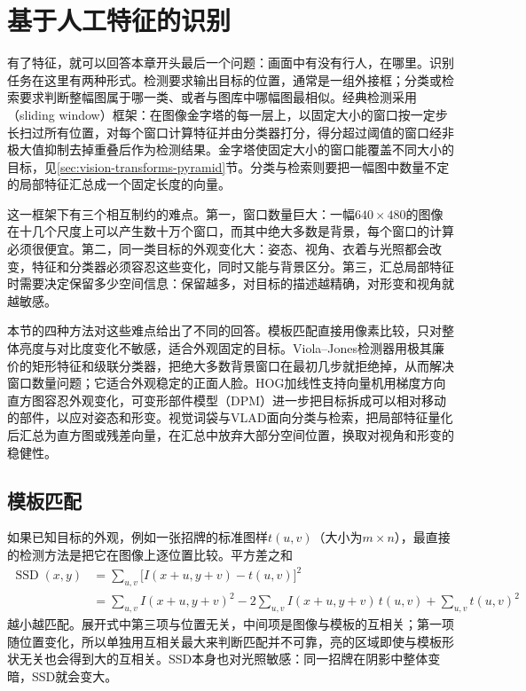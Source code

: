 \section{基于人工特征的识别}
\label{sec:vision-features-recognition}

有了特征，就可以回答本章开头最后一个问题：画面中有没有行人，在哪里。识别任务在这里有两种形式。检测要求输出目标的位置，通常是一组外接框；分类或检索要求判断整幅图属于哪一类、或者与图库中哪幅图最相似。经典检测采用（sliding window）框架：在图像金字塔的每一层上，以固定大小的窗口按一定步长扫过所有位置，对每个窗口计算特征并由分类器打分，得分超过阈值的窗口经非极大值抑制去掉重叠后作为检测结果。金字塔使固定大小的窗口能覆盖不同大小的目标，见\ref{sec:vision-transforms-pyramid}节。分类与检索则要把一幅图中数量不定的局部特征汇总成一个固定长度的向量。

这一框架下有三个相互制约的难点。第一，窗口数量巨大：一幅$640\times480$的图像在十几个尺度上可以产生数十万个窗口，而其中绝大多数是背景，每个窗口的计算必须很便宜。第二，同一类目标的外观变化大：姿态、视角、衣着与光照都会改变，特征和分类器必须容忍这些变化，同时又能与背景区分。第三，汇总局部特征时需要决定保留多少空间信息：保留越多，对目标的描述越精确，对形变和视角就越敏感。

本节的四种方法对这些难点给出了不同的回答。模板匹配直接用像素比较，只对整体亮度与对比度变化不敏感，适合外观固定的目标。Viola–Jones检测器用极其廉价的矩形特征和级联分类器，把绝大多数背景窗口在最初几步就拒绝掉，从而解决窗口数量问题；它适合外观稳定的正面人脸。HOG加线性支持向量机用梯度方向直方图容忍外观变化，可变形部件模型（DPM）进一步把目标拆成可以相对移动的部件，以应对姿态和形变。视觉词袋与VLAD面向分类与检索，把局部特征量化后汇总为直方图或残差向量，在汇总中放弃大部分空间位置，换取对视角和形变的稳健性。

\subsection{模板匹配}
\label{sec:vision-features-template-matching}

如果已知目标的外观，例如一张招牌的标准图样$t(u,v)$（大小为$m\times n$），最直接的检测方法是把它在图像上逐位置比较。平方差之和
\begin{align*}
  \operatorname{SSD}(x,y)&=\sum_{u,v}\bigl[I(x+u,y+v)-t(u,v)\bigr]^2\\
  &=\sum_{u,v}I(x+u,y+v)^2-2\sum_{u,v}I(x+u,y+v)\,t(u,v)+\sum_{u,v}t(u,v)^2
\end{align*}
越小越匹配。展开式中第三项与位置无关，中间项是图像与模板的互相关；第一项随位置变化，所以单独用互相关最大来判断匹配并不可靠，亮的区域即使与模板形状无关也会得到大的互相关。SSD本身也对光照敏感：同一招牌在阴影中整体变暗，SSD就会变大。

